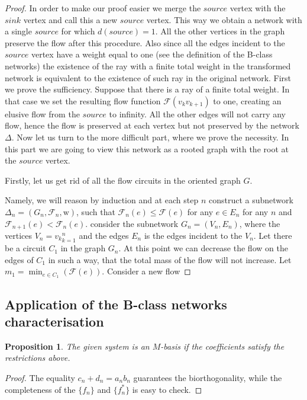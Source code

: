 \documentclass[12pt]{article}
\renewcommand{\leq}{\leqslant}
\newtheorem{prop}{Proposition}
\theoremstyle{definition}
\newcommand{\wt}{\mathrm{w}}
\newcommand{\flow}{\mathcal{F}}
\newcommand{\source}{\mathit{source}}
\newcommand{\sink}{\mathit{sink}}
\newcommand{\net}{\Delta}
\numberwithin{remark}{section}
\numberwithin{theorem}{section}
\numberwithin{prop}{section}
\numberwithin{equation}{section}
\numberwithin{lemma}{section}
\numberwithin{prop_under_lemma}{lemma}
\begin{document}
    \begin{proof}
      In order to make our proof easier we merge the $\source$ vertex with the $\sink$ vertex and call this a
      new $\source$ vertex.
      This way we obtain a network with a single $\source$ for which $d(\source) = 1$.
      All the other vertices in the graph preserve the flow after this procedure.
      Also since all the edges incident to the $\source$ vertex have a weight equal to one
      (see the definition of the B-class networks) the existence of the ray with a finite total weight
      in the transformed network is equivalent to the existence of such ray in the original network.
      First we prove the sufficiency.
      Suppose that there is a ray of a finite total weight. 
      In that case we set the resulting flow function $\flow(v_k v_{k+1})$ to one, creating an elusive flow
      from the $\source$ to infinity. All the other edges will not carry any flow, hence the flow is preserved
      at each vertex but not preserved by the network $\net$.
      Now let us turn to the more difficult part, where we prove the necessity.
      In this part we are going to view this network as a rooted graph with the root at the $\source$ vertex.

      Firstly, let us get rid of all the flow circuits in the oriented graph $G$.

      Namely, we will reason by induction and at each step $n$ construct a subnetwork
      $\net_n = (G_n, \flow_n, \wt)$, such that $\flow_n(e) \leq \flow(e)$ for any $e \in E_n$ for any $n$
      and $\flow_{n+1}(e) < \flow_n(e)$.
      consider the subnetwork $G_n = (V_n, E_n)$, where the vertices
      $V_n = {v_k}_{k=1}^n$ and the edges $E_n$ is the edges incident to the $V_n$.
      Let there be a circuit $C_1$ in the graph $G_n$.
      At this point we can decrease the flow on the edges of $C_1$ in such a way, that the total mass
      of the flow will not increase.
      Let $m_1 = \min_{e \in C_1}(\flow(e))$.
      Consider a new flow

    \end{proof}
    \subsection{Application of the B-class networks characterisation}
    \pagebreak
    \begin{prop}
        The given system is an $M$-basis if the coefficients satisfy the restrictions above.
    \end{prop}
    \begin{proof}
        The equality $c_n + d_n = a_n b_n$ guarantees the bi\-orthogonality,
        while the completeness of the $\{f_n\}$ and $\{f_n^*\}$ is
        easy to check.
    \end{proof}
    
\end{document}

